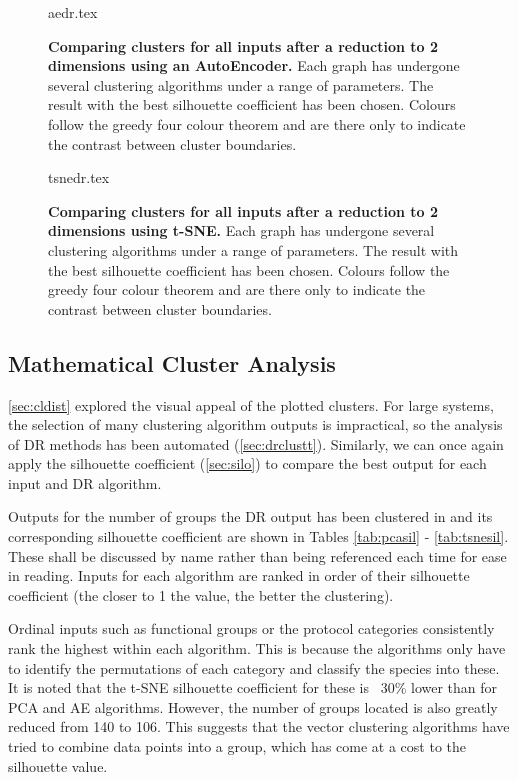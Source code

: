 \begin{landscape}
\begin{figure}[H]
    {aedr.tex}
    \caption{\textbf{Comparing clusters for all inputs after a reduction to 2 dimensions using an AutoEncoder.}
    Each graph has undergone several clustering algorithms under a range of parameters. The result with the best silhouette coefficient has been chosen. Colours follow the greedy four colour theorem and are there only to indicate the contrast between cluster boundaries.}
    \label{fig:aevis}
\end{figure}
\end{landscape}


\begin{landscape}
\begin{figure}[H]
    {tsnedr.tex}
    \caption{\textbf{Comparing clusters for all inputs after a reduction to 2 dimensions using t-SNE.}
    Each graph has undergone several clustering algorithms under a range of parameters. The result with the best silhouette coefficient has been chosen. Colours follow the greedy four colour theorem and are there only to indicate the contrast between cluster boundaries.}
    \label{fig:tsnevis}
\end{figure}
\end{landscape}



\subsection{Mathematical Cluster Analysis}\label{sec:mathclustanalysis}

\autoref{sec:cldist} explored the visual appeal of the plotted clusters. For large systems, the selection of many clustering algorithm outputs is impractical, so the analysis of DR methods has been automated (\autoref{sec:drclustt}). Similarly, we can once again apply the silhouette coefficient (\autoref{sec:silo})
to compare the best output for each input and DR algorithm.

Outputs for the number of groups the DR output has been clustered in and its corresponding silhouette coefficient are shown in Tables \ref{tab:pcasil} - \ref{tab:tsnesil}. These shall be discussed by name rather than being referenced each time for ease in reading.
Inputs for each algorithm are ranked in order of their silhouette coefficient (the closer to 1 the value, the better the clustering).

Ordinal inputs such as functional groups or the protocol categories consistently rank the highest within each algorithm. This is because the algorithms only have to identify the permutations of each category and classify the species into these. It is noted that the t-SNE silhouette coefficient for these is ~30\% lower than for PCA and AE algorithms. However, the number of groups located is also greatly reduced from 140 to 106. This suggests that the vector clustering algorithms have tried to combine data points into a group, which has come at a cost to the silhouette value.

